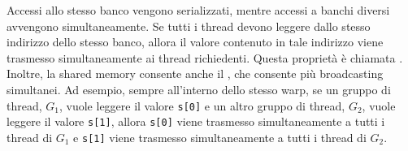 Accessi allo stesso banco vengono serializzati, mentre accessi a banchi diversi avvengono simultaneamente.
Se tutti i thread devono leggere dallo stesso indirizzo dello stesso banco, allora il valore contenuto in tale indirizzo viene trasmesso simultaneamente ai thread richiedenti. Questa proprietà è chiamata .
Inoltre, la shared memory consente anche il , che consente più broadcasting simultanei.
Ad esempio, sempre all'interno dello stesso warp, se un gruppo di thread, \(G_{1}\), vuole leggere il valore \texttt{s[0]} e un altro gruppo di thread, \(G_{2}\), vuole leggere il valore \texttt{s[1]}, allora \texttt{s[0]} viene trasmesso simultaneamente a tutti i thread di \(G_{1}\) e \texttt{s[1]} viene trasmesso simultaneamente a tutti i thread di \(G_{2}\).
